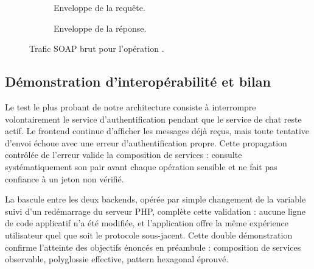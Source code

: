 \begin{figure}[H]
  \centering
  \begin{subfigure}[t]{0.48\linewidth}
    \centering
    \fbox{\rule{0pt}{5cm}\rule{6cm}{0pt}}
    \caption{Enveloppe de la requête.}
  \end{subfigure}\hfill
  \begin{subfigure}[t]{0.48\linewidth}
    \centering
    \fbox{\rule{0pt}{5cm}\rule{6cm}{0pt}}
    \caption{Enveloppe de la réponse.}
  \end{subfigure}
  \caption{Trafic SOAP brut pour l'opération .}
  \label{fig:soapui-raw}
\end{figure}

\subsection{Démonstration d'interopérabilité et bilan}

Le test le plus probant de notre architecture consiste à interrompre volontairement le service d'authentification pendant que le service de chat reste actif. Le frontend continue d'afficher les messages déjà reçus, mais toute tentative d'envoi échoue avec une erreur d'authentification propre. Cette propagation contrôlée de l'erreur valide la composition de services :  consulte systématiquement son pair avant chaque opération sensible et ne fait pas confiance à un jeton non vérifié.

La bascule entre les deux backends, opérée par simple changement de la variable  suivi d'un redémarrage du serveur PHP, complète cette validation : aucune ligne de code applicatif n'a été modifiée, et l'application offre la même expérience utilisateur quel que soit le protocole sous-jacent. Cette double démonstration confirme l'atteinte des objectifs énoncés en préambule : composition de services observable, polyglossie effective, pattern hexagonal éprouvé.
